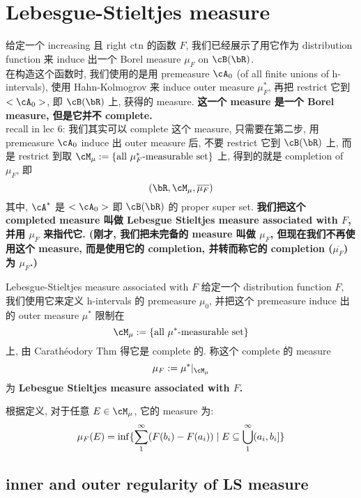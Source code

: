 \documentclass[lang=cn,11pt]{elegantbook}
\begin{document}
\chapter{Lebesgue-Stieltjes measure}
给定一个 increasing 且 right ctn 的函数 $F$, 我们已经展示了用它作为 distribution function 来 induce 出一个 Borel measure $\mu_F$ on $\cB(\bR)$. \\
在构造这个函数时, 我们使用的是用 premeasure $\cA_0$ (of all finite unions of h-intervals), 使用 Hahn-Kolmogrov 来 induce outer measure $\mu_F^*$, 再把 restrict 它到 $<\cA_0>$, 即 $\cB(\bR)$ 上, 获得的 measure. \textbf{这一个 measure 是一个 Borel measure, 但是它并不 complete. }\\
recall in lec 6: 我们其实可以 complete 这个 measure, 只需要在第二步, 用 premeasure $\cA_0$ induce 出 outer measure 后, 不要 restrict 它到 $\cB(\bR)$ 上, 而是 restrict 到取 $\cM_\mu := \{ \text{all } \mu_F^* \text{-measurable set\}}$ 上, 得到的就是 completion of $\mu_F$, 即 $$(\bR, \cM_\mu, \overline{\mu_F})$$
其中, $\cA^*$ 是 $<\cA_0>$ 即 $\cB(\bR)$ 的 proper super set. \textbf{我们把这个 completed measure 叫做 Lebesgue Stieltjes measure associated with $F$, 并用 $\mu_F$ 来指代它. (刚才, 我们把未完备的 measure 叫做 $\mu_F$, 但现在我们不再使用这个 measure, 而是使用它的 completion, 并转而称它的 completion ($\overline{\mu_F}$) 为 $\mu_F$.)}



\begin{definition}{Lebesgue-Stieltjes measure associated with $F$}
给定一个 distribution function $F$, 我们使用它来定义 h-intervals 的 premeasure $\mu_0$, 并把这个 premeasure induce 出的 outer measure $\mu^*$ 限制在 $$\cM_\mu := \{ \text{all } \mu^* \text{-measurable set\}}$$ 上, 由 Carathéodory Thm 得它是 complete 的. 称这个 complete 的 measure $$\mu_F := \mu^* |_{\cM_\mu}$$ 为 \textbf{Lebesgue Stieltjes measure associated with $F$. }
\end{definition}
\begin{remark}
根据定义, 对于任意 $E \in \cM_\mu$, 它的 measure 为:$$
\mu_F(E) = \inf \{ \sum_1^\infty (F(b_i) - F(a_i))   \mid E \subseteq \bigcup_1^\infty (a_i, b_i]      \}
$$
\end{remark}

\section{inner and outer regularity of LS measure}
\end{document}
